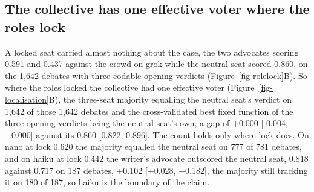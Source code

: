 \subsection{The collective has one effective voter where the roles lock}
\label{sec-results-collective}

A locked seat carried almost nothing about the case, the two advocates
scoring 0.591 and 0.437 against the crowd on grok while the neutral seat
scored 0.860, on the 1,642 debates with three codable opening verdicts
(Figure~\ref{fig-rolelock}B).
So where the roles locked the collective had one effective voter
(Figure~\ref{fig-localisation}B), the three-seat majority equalling the
neutral seat's verdict on 1,642 of those 1,642 debates and the
cross-validated best fixed function of the three opening verdicts being
the neutral seat's own, a gap of +0.000 [-0.004, +0.000] against its
0.860 [0.822, 0.896].
The count holds only where lock does. On nano at lock 0.620 the majority
equalled the neutral seat on 777 of 781 debates, and on haiku at lock 0.442
the writer's advocate outscored the neutral seat, 0.818 against 0.717 on
187 debates, +0.102 [+0.028, +0.182], the majority still tracking it on
180 of 187, so haiku is the boundary of the claim.

